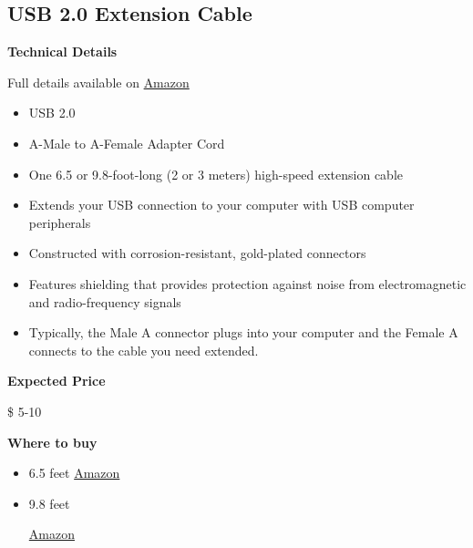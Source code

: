 \subsection{USB 2.0 Extension Cable}
\begin{gram}

\textbf{Technical Details}

Full details available on \href{https://www.amazon.com/AmazonBasics-Extension-Cable-Male-Female/dp/B00NH11PEY/ref=sr_1_3?crid=37GCZPQHYO54W&keywords=usb+extension+cable&qid=1582900847&s=electronics&sprefix=usb+ext,electronics,164&sr=1-3}{Amazon}

\begin{itemize}
\item USB 2.0
\item A-Male to A-Female Adapter Cord
\item  One 6.5 or 9.8-foot-long (2 or 3 meters) high-speed extension cable
\item Extends your USB connection to your computer with USB computer peripherals
\item 
Constructed with corrosion-resistant, gold-plated connectors
\item Features shielding that provides protection against noise from electromagnetic and radio-frequency signals
\item Typically, the Male A connector plugs into your computer and the Female A connects to the cable you need extended. 

\end{itemize}

\textbf{Expected Price}

\$ 5-10

\textbf{Where to buy}

\begin{itemize}
\item 
6.5 feet
\href{https://www.amazon.com/AmazonBasics-Extension-Cable-Male-Female/dp/B00NH136G}{Amazon}

\item
9.8 feet

\href{https://www.amazon.com/AmazonBasics-Extension-Cable-Male-Female/dp/B00NH11PEY/ref=sr_1_3?crid=37GCZPQHYO54W&keywords=usb+extension+cable&qid=1582900847&s=electronics&sprefix=usb+ext,electronics,164&sr=1-3}{Amazon}
\end{itemize}
\end{gram}
